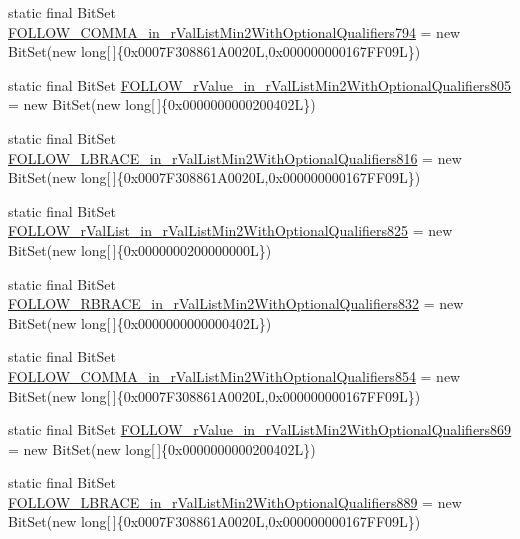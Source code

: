 \begin{DoxyCompactItemize}
\item 
static final Bit\-Set \hyperlink{classorg_1_1tzi_1_1use_1_1parser_1_1soil_1_1_soil_parser_a65f8760a0304c03999c893f20098d29d}{F\-O\-L\-L\-O\-W\-\_\-\-C\-O\-M\-M\-A\-\_\-in\-\_\-r\-Val\-List\-Min2\-With\-Optional\-Qualifiers794} = new Bit\-Set(new long\mbox{[}$\,$\mbox{]}\{0x0007\-F308861\-A0020\-L,0x000000000167\-F\-F09\-L\})
\item 
static final Bit\-Set \hyperlink{classorg_1_1tzi_1_1use_1_1parser_1_1soil_1_1_soil_parser_a5e0d5132fccb9f6030e4495198c0e997}{F\-O\-L\-L\-O\-W\-\_\-r\-Value\-\_\-in\-\_\-r\-Val\-List\-Min2\-With\-Optional\-Qualifiers805} = new Bit\-Set(new long\mbox{[}$\,$\mbox{]}\{0x0000000000200402\-L\})
\item 
static final Bit\-Set \hyperlink{classorg_1_1tzi_1_1use_1_1parser_1_1soil_1_1_soil_parser_a6023fea0070ef9337b0f4f236d80b57f}{F\-O\-L\-L\-O\-W\-\_\-\-L\-B\-R\-A\-C\-E\-\_\-in\-\_\-r\-Val\-List\-Min2\-With\-Optional\-Qualifiers816} = new Bit\-Set(new long\mbox{[}$\,$\mbox{]}\{0x0007\-F308861\-A0020\-L,0x000000000167\-F\-F09\-L\})
\item 
static final Bit\-Set \hyperlink{classorg_1_1tzi_1_1use_1_1parser_1_1soil_1_1_soil_parser_ad9726be6dce2ad9af432be565af0f8eb}{F\-O\-L\-L\-O\-W\-\_\-r\-Val\-List\-\_\-in\-\_\-r\-Val\-List\-Min2\-With\-Optional\-Qualifiers825} = new Bit\-Set(new long\mbox{[}$\,$\mbox{]}\{0x0000000200000000\-L\})
\item 
static final Bit\-Set \hyperlink{classorg_1_1tzi_1_1use_1_1parser_1_1soil_1_1_soil_parser_aefa7a0aec6d7892020e258143e62a0a6}{F\-O\-L\-L\-O\-W\-\_\-\-R\-B\-R\-A\-C\-E\-\_\-in\-\_\-r\-Val\-List\-Min2\-With\-Optional\-Qualifiers832} = new Bit\-Set(new long\mbox{[}$\,$\mbox{]}\{0x0000000000000402\-L\})
\item 
static final Bit\-Set \hyperlink{classorg_1_1tzi_1_1use_1_1parser_1_1soil_1_1_soil_parser_a31c77826917cd63858423ea4e6cf2232}{F\-O\-L\-L\-O\-W\-\_\-\-C\-O\-M\-M\-A\-\_\-in\-\_\-r\-Val\-List\-Min2\-With\-Optional\-Qualifiers854} = new Bit\-Set(new long\mbox{[}$\,$\mbox{]}\{0x0007\-F308861\-A0020\-L,0x000000000167\-F\-F09\-L\})
\item 
static final Bit\-Set \hyperlink{classorg_1_1tzi_1_1use_1_1parser_1_1soil_1_1_soil_parser_af32811dff39ac1a53deeafc1f15b91a1}{F\-O\-L\-L\-O\-W\-\_\-r\-Value\-\_\-in\-\_\-r\-Val\-List\-Min2\-With\-Optional\-Qualifiers869} = new Bit\-Set(new long\mbox{[}$\,$\mbox{]}\{0x0000000000200402\-L\})
\item 
static final Bit\-Set \hyperlink{classorg_1_1tzi_1_1use_1_1parser_1_1soil_1_1_soil_parser_a33ef5c237030e5fbcac8813c91b63e92}{F\-O\-L\-L\-O\-W\-\_\-\-L\-B\-R\-A\-C\-E\-\_\-in\-\_\-r\-Val\-List\-Min2\-With\-Optional\-Qualifiers889} = new Bit\-Set(new long\mbox{[}$\,$\mbox{]}\{0x0007\-F308861\-A0020\-L,0x000000000167\-F\-F09\-L\})

\end{DoxyCompactItemize}
